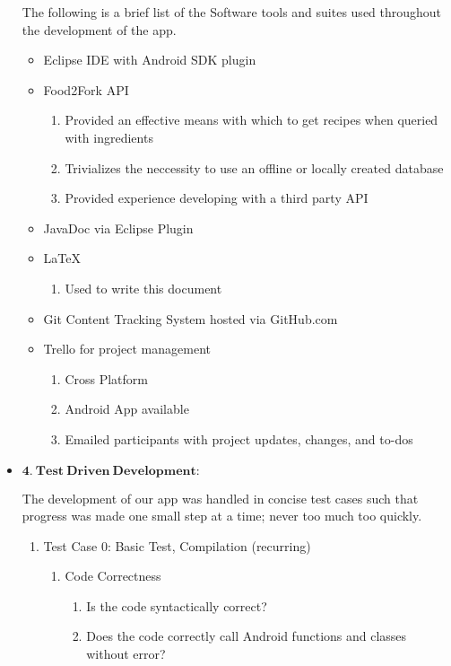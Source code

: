 \documentclass[a4paper,11pt]{article}
\begin{document}
\begin{itemize}
\parindent 30pt
The following is a brief list of the Software tools and suites used throughout the development of the app.
\begin{itemize}
\item Eclipse IDE with Android SDK plugin
\item Food2Fork API
	\begin{enumerate}
	\item Provided an effective means with which to get recipes when queried with ingredients
	\item Trivializes the neccessity to use an offline or locally created database
	\item Provided experience developing with a third party API
	\end{enumerate}
\item JavaDoc via Eclipse Plugin
\item LaTeX
	\begin{enumerate}
	\item Used to write this document
	\end{enumerate}
\item Git Content Tracking System hosted via GitHub.com
\item Trello for project management
	\begin{enumerate}
	\item Cross Platform
	\item Android App available
	\item Emailed participants with project updates, changes, and to-dos
	\end{enumerate}
\end{itemize}

\newpage
\item $\mathbf{4.\ Test\ Driven\ Development:}$
\parindent 30pt

The development of our app was handled in concise test cases such that progress was made one small step at a time; never too much too quickly. \
\begin{enumerate}
\item Test Case 0: Basic Test, Compilation (recurring)
	\begin{enumerate}
	\item Code Correctness
		\begin{enumerate}
		\item Is the code syntactically correct?
		\item Does the code correctly call Android functions and classes without error?
		\end{enumerate}
	\end{enumerate}


\end{enumerate}
\end{itemize}
\end{document}
